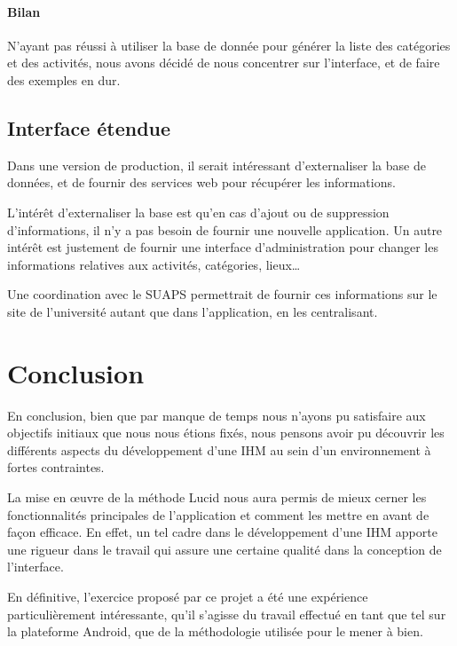 \documentclass[french, titlepage, 11pt, a4paper]{article}
\begin{document}
        \paragraph{Bilan} N'ayant pas réussi à utiliser la base de donnée pour
        générer la liste des catégories et des activités, nous avons décidé de
        nous concentrer sur l'interface, et de faire des exemples en dur.


    \subsection{Interface étendue}

        Dans une version de production, il serait intéressant d'externaliser la
        base de données, et de fournir des services web pour récupérer les
        informations.

        L'intérêt d'externaliser la base est qu'en cas d'ajout ou de suppression
        d'informations, il n'y a pas besoin de fournir une nouvelle application.
        Un autre intérêt est justement de fournir une interface d'administration
        pour changer les informations relatives aux activités, catégories,
        lieux\dots

        Une coordination avec le SUAPS permettrait de fournir ces informations
        sur le site de l'université autant que dans l'application, en les centralisant.


\section*{Conclusion}

En conclusion, bien que par manque de temps nous n'ayons pu satisfaire aux
objectifs initiaux que nous nous étions fixés, nous pensons avoir pu découvrir
les différents aspects du développement d'une IHM au sein d'un environnement à
fortes contraintes.

La mise en \oe uvre de la méthode Lucid nous aura permis de mieux cerner
les fonctionnalités principales de l'application et comment les mettre en avant
de façon efficace.
En effet, un tel cadre dans le développement d'une IHM apporte une rigueur dans
le travail qui assure une certaine qualité dans la conception de l'interface.

En définitive, l'exercice proposé par ce projet a été une expérience
particulièrement intéressante, qu'il s'agisse du travail effectué en tant que
tel sur la plateforme Android, que de la méthodologie utilisée pour le mener à
bien.
\end{document}

